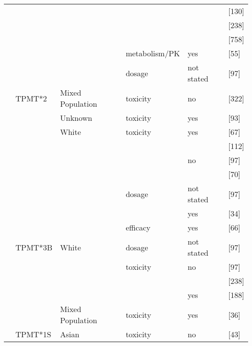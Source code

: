 \begin{center}
\begin{longtable}[H]{|l|l|l|l||l||l|}
\cline{6-6}
& & & & & \citeauthor{WINTER_2007} \citeyear{WINTER_2007} [130] \\
\cline{6-6}
& & & & & \citeauthor{Moloney_2006} \citeyear{Moloney_2006} [238] \\
\cline{6-6}
& & & & & \citeauthor{pmid20593505} \citeyear{pmid20593505} [758] \\
\cline{4-6}
& & & metabolism/PK & yes & \citeauthor{Hindorf_2004} \citeyear{Hindorf_2004} [55] \\
\cline{4-6}
& & & dosage & not stated & \citeauthor{Gazouli_2010} \citeyear{Gazouli_2010} [97] \\
\cline{2-6}
& TPMT*2 & Mixed Population & toxicity & no & \citeauthor{Newman_2011} \citeyear{Newman_2011} [322] \\
\cline{3-6}
& & Unknown & toxicity & yes & \citeauthor{Liang_2013} \citeyear{Liang_2013} [93] \\
\cline{3-6}
& & White & toxicity & yes & \citeauthor{pmid9841604} \citeyear{pmid9841604} [67] \\
\cline{6-6}
& & & & & \citeauthor{pmid16044099} \citeyear{pmid16044099} [112] \\
\cline{5-6}
& & & & no & \citeauthor{Gazouli_2010} \citeyear{Gazouli_2010} [97] \\
\cline{6-6}
& & & & & \citeauthor{Stocco_2005} \citeyear{Stocco_2005} [70] \\
\cline{4-6}
& & & dosage & not stated & \citeauthor{Gazouli_2010} \citeyear{Gazouli_2010} [97] \\
\cline{5-6}
& & & & yes & \citeauthor{Stocco_2005} \citeyear{Stocco_2005} [34] \\
\cline{4-6}
& & & efficacy & yes & \citeauthor{pmid9841604} \citeyear{pmid9841604} [66] \\
\cline{2-6}
& TPMT*3B & White & dosage & not stated & \citeauthor{Gazouli_2010} \citeyear{Gazouli_2010} [97] \\
\cline{4-6}
& & & toxicity & no & \citeauthor{Gazouli_2010} \citeyear{Gazouli_2010} [97] \\
\cline{6-6}
& & & & & \citeauthor{Moloney_2006} \citeyear{Moloney_2006} [238] \\
\cline{5-6}
& & & & yes & \citeauthor{Wroblova_2012} \citeyear{Wroblova_2012} [188] \\
\cline{3-6}
& & Mixed Population & toxicity & yes & \citeauthor{Formea_2004} \citeyear{Formea_2004} [36] \\
\cline{2-6}
& TPMT*1S & Asian & toxicity & no & \citeauthor{Cao_2009} \citeyear{Cao_2009} [43] \\

\end{longtable}
\end{center}
